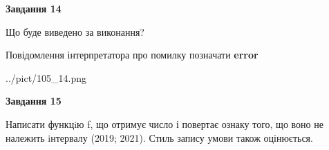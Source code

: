 \documentclass[11pt, ukrainian]{article}
\begin{document}
{\begin {large}
{\begin {center}\textbf{Завдання 14}\end {center}}\par
Що буде виведено за виконання? \par
Повідомлення інтерпретатора про помилку позначати \textbf{error}

\begin{center}
	{../pict/105_14.png}
\end{center}
\newpage

{\begin {center}\textbf{Завдання 15}\end {center}}\par

Написати функцiю f, що отримує число і повертає ознаку того, що воно не належить iнтервалу (2019; 2021). Стиль запису умови також оцінюється.\par
\newpage

\end {large}}
\end{document}
